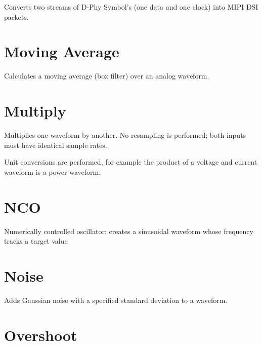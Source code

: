 Converts two streams of D-Phy Symbol's (one data and one clock) into MIPI DSI packets.

\pagebreak
\section{Moving Average}

Calculates a moving average (box filter) over an analog waveform.

\pagebreak
\section{Multiply}

Multiplies one waveform by another. No resampling is performed; both inputs must have identical sample rates.

Unit conversions are performed, for example the product of a voltage and current waveform is a power waveform.

\pagebreak
\section{NCO}

Numerically controlled oscillator: creates a sinusoidal waveform whose frequency tracks a target value

\pagebreak
\section{Noise}

Adds Gaussian noise with a specified standard deviation to a waveform.

\pagebreak
\section{Overshoot}

\pagebreak
